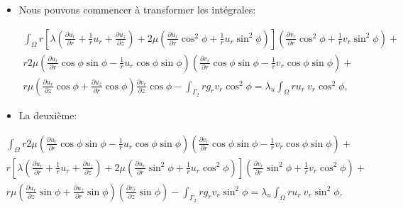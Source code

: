\documentclass[french]{beamer}
\begin{document}
\begin{frame}
 \begin{itemize}
 
   \item  Nous pouvons commencer à transformer les intégrales:
   
   \begin{tiny}
   
   
   \begin{eqnarray*} \int_{\Omega} r \left[\lambda (\frac{\partial u_r}{\partial r} + \frac{1}{r} u_r + \frac{\partial u_z}{\partial z}) + 2 \mu (\frac{\partial u_r}{\partial r}\cos^2\phi + \frac{1}{r} u_r\sin^2\phi)\right] (\frac{\partial v_r}{\partial r}\cos^2\phi + \frac{1}{r} v_r\sin^2\phi) + \\ r 2 \mu \left(\frac{\partial u_r}{\partial r}\cos\phi\sin\phi - \frac{1}{r}u_r \cos\phi\sin\phi\right)\left(\frac{\partial v_r}{\partial r}\cos\phi\sin\phi - \frac{1}{r}v_r \cos\phi\sin\phi\right) + \\ r \mu \left(\frac{\partial u_r}{\partial z}\cos\phi + \frac{\partial u_z}{\partial r}\cos\phi\right)\frac{\partial v_r}{\partial z}\cos\phi - \int_{\Gamma_2} r g_r v_r {\cos}^2 \phi = \lambda_u \int_{\Omega} r u_r\ v_r \cos^2 \phi, \end{eqnarray*}
   
   
   \end{tiny}
 \end{itemize}


\end{frame}


\begin{frame}

 \begin{itemize}
   \item La deuxième:
 \end{itemize}

\begin{tiny}
\begin{eqnarray*} 
\int_{\Omega} r 2\mu \left(\frac{\partial u_r}{\partial r}\cos\phi\sin\phi - \frac{1}{r}u_r \cos\phi\sin\phi\right)\left(\frac{\partial v_r}{\partial r}\cos\phi\sin\phi - \frac{1}{r}v_r \cos\phi\sin\phi\right) +\\  r \left[\lambda (\frac{\partial u_r}{\partial r} + \frac{1}{r} u_r + \frac{\partial u_z}{\partial z}) + 2 \mu (\frac{\partial u_r}{\partial r}\sin^2\phi + \frac{1}{r} u_r\cos^2\phi)\right] (\frac{\partial v_r}{\partial r}\sin^2\phi + \frac{1}{r} v_r\cos^2\phi) + \\  r \mu \left(\frac{\partial u_r}{\partial z}\sin\phi + \frac{\partial u_z}{\partial r}\sin\phi\right)(\frac{\partial v_r}{\partial z}\sin\phi)  - \int_{\Gamma_2}r g_r v_r \sin^2 \phi =\lambda_u \int_{\Omega}r u_r\ v_r \sin^2 \phi,\\ \end{eqnarray*} 
\end{tiny}

\end{frame}
\end{document}
